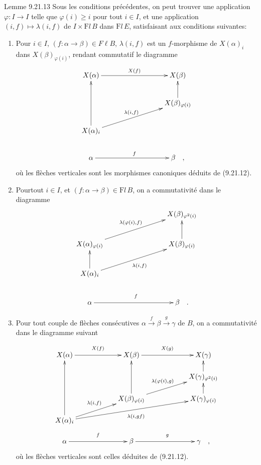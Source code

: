 \documentclass[10pt]{../fichiers-configuration-latex/smfart}
\def\labelenumi{(\theenumi)}
\begin{document}
\begin{enonce*}{Lemme 9.21.13}
Sous les conditions précédentes, on peut trouver une application
$\varphi:I\rightarrow I$ telle que $\varphi(i)\geq i$ pour tout
$i\in I$, et une application $(i,f)\mapsto \lambda(i,f)$ de $I\times
\mathrm{F}{}l\, B$ dans $%
\mathrm{F}{}l\, E$, satisfaisant aux conditions suivantes:
\begin{enumerate}
\renewcommand{\theenumi}{\alph{enumi}}
\renewcommand{\labelenumi}{\theenumi)}
\item Pour $i\in I$, $(f:\alpha\rightarrow \beta)\in F\ell B$,
$\lambda(i,f)$ est un $f$-morphisme de $X(\alpha)_i$ dans
$X(\beta)_{\varphi(i)}$, rendant commutatif le diagramme
\[
\xymatrix@C=3cm@R=.8cm{
 X(\alpha)\ar[r]^{X(f)} & X(\beta)\\
           &  X(\beta)_{\varphi(i)}\ar[u]\\
X(\alpha)_{i} \ar[uu]\ar[ru]^{\lambda(i,f)}&
                  \\
\alpha \ar[r]^{f}& \beta\quad , }
\]
où les flèches verticales sont les morphismes canoniques déduits de
(9.21.12).

\item Pour\pageoriginale tout $i\in I$, et $(f:\alpha\rightarrow
  \beta)\in %
\mathrm{F}{}l\, B$, on a commutativité dans le diagramme
\[
\xymatrix@C=3cm@R=.9cm@L=6pt{
                      & X(\beta)_{\varphi^{2}(i)}\\
  X(\alpha)_{\varphi(i)} \ar[ru]^{\lambda(\varphi(i),f)}  & X(\beta)_{\varphi(i)} \ar[u]\\
X(\alpha)_i  \ar[ru]_{\lambda(i,f)} \ar[u]         \\
\alpha \ar[r]^{f} & \beta\quad . }
\]

\item Pour tout couple de flèches consécutives
$\alpha\xrightarrow{f}\beta\xrightarrow{g}\gamma$ de $B$, on a
commutativité dans le diagramme suivant
\[
\xymatrix@C=2cm@L=6pt@R=.5cm{
X(\alpha) \ar[r]^{X(f)}& X(\beta) \ar[r]^{X(g)}            & X(\gamma)\\
          &                      & X(\gamma)_{\varphi^{2}(i)}\ar[u]\\
          & X(\beta)_{\varphi(i)} \ar[uu]\ar[ru]^{\lambda(\varphi(i),g)} & X(\gamma)_{\varphi(i)}\ar[u]\\
X(\alpha)_i \ar[uuu]\ar[ru]^{\lambda(i,f)} \ar[rru]_{\lambda(i,gf)}&
 \\
\alpha \ar[r]^{f}& \beta \ar[r]^{g}& \gamma\quad , }
\]
où les flèches verticales sont celles déduites de
(9.21.12).
\end{enumerate}
\end{enonce*}
\end{document}
